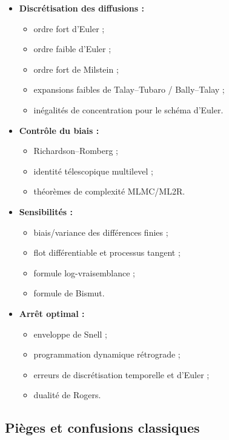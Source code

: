 \documentclass[11pt,a4paper]{article}
\begin{document}
\begin{itemize}
  \item \textbf{Discrétisation des diffusions :}
  \begin{itemize}
    \item ordre fort d'Euler ;
    \item ordre faible d'Euler ;
    \item ordre fort de Milstein ;
    \item expansions faibles de Talay--Tubaro / Bally--Talay ;
    \item inégalités de concentration pour le schéma d'Euler.
  \end{itemize}

  \item \textbf{Contrôle du biais :}
  \begin{itemize}
    \item Richardson--Romberg ;
    \item identité télescopique multilevel ;
    \item théorèmes de complexité MLMC/ML2R.
  \end{itemize}

  \item \textbf{Sensibilités :}
  \begin{itemize}
    \item biais/variance des différences finies ;
    \item flot différentiable et processus tangent ;
    \item formule log-vraisemblance ;
    \item formule de Bismut.
  \end{itemize}

  \item \textbf{Arrêt optimal :}
  \begin{itemize}
    \item enveloppe de Snell ;
    \item programmation dynamique rétrograde ;
    \item erreurs de discrétisation temporelle et d'Euler ;
    \item dualité de Rogers.
  \end{itemize}
\end{itemize}

\subsection{Pièges et confusions classiques}
\end{document}
